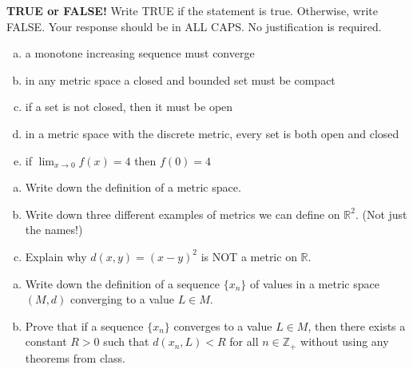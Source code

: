 \documentclass[11pt]{exam}
\theoremstyle{definition}
\begin{document}
\begin{questions}

\addpoints

\question[10]\mbox{}
\textbf{TRUE or FALSE!}  Write  TRUE if the statement is true.  Otherwise, write FALSE.  Your response should be in ALL CAPS.  No justification is required.
\begin{enumerate}[(a)]
\item a monotone increasing sequence must converge 
\vspace{1.2in}
\item in any metric space a closed and bounded set must be compact
\vspace{1.2in}
\item if a set is not closed, then it must be open
\vspace{1.2in}
\item in a metric space with the discrete metric, every set is both open and closed
\vspace{1.2in}
\item if $\lim_{x\rightarrow 0} f(x) = 4$ then $f(0) = 4$
\vspace{1.2in}
\end{enumerate}

\newpage
\question[10]\mbox{}

\begin{enumerate}[(a)]
\item
Write down the definition of a metric space.
\vspace{3in}
\item 
Write down three different examples of metrics we can define on $\mathbb{R}^2$. (Not just the names!)
\vspace{2in}
\item 
Explain why $d(x,y) = (x-y)^2$ is NOT a metric on $\mathbb{R}$.
\end{enumerate}

\newpage
\question[10]\mbox{}
\begin{enumerate}[(a)]
\item Write down the definition of a sequence $\{x_n\}$ of values in a metric space $(M,d)$ converging to a value $L\in M$.
\vspace{1in}

\item Prove that if a sequence $\{x_n\}$ converges to a value $L\in M$, then there exists a constant $R>0$ such that $d(x_n,L) < R$ for all $n\in\mathbb{Z}_+$ without using any theorems from class.
\end{enumerate}


\end{questions}
\end{document}

